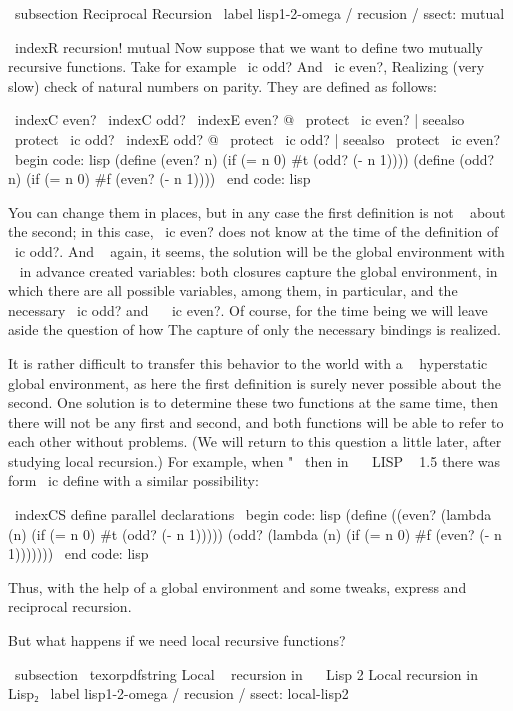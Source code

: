 \ subsection {Reciprocal Recursion} \ label {lisp1-2-omega / recusion / ssect: mutual}

\ indexR {recursion! mutual}
Now suppose that we want to define two mutually recursive functions.
Take for example \ ic {odd?} And \ ic {even?}, Realizing (very slow)
check of natural numbers on parity. They are defined as follows:

\ indexC {even?} \ indexC {odd?}
\ indexE {even? @ \ protect \ ic {even?} | seealso { \ protect \ ic {odd?}}}
\ indexE {odd? @ \ protect \ ic {odd?} | seealso { \ protect \ ic {even?}}}
\ begin {code: lisp}
(define (even? n)
  (if (= n 0) #t (odd? (- n 1))))
(define (odd? n)
  (if (= n 0) #f (even? (- n 1))))
\ end {code: lisp}

You can change them in places, but in any case the first definition is not ~
about the second; in this case, \ ic {even?} does not know at the time of the definition of
\ ic {odd?}. And ~ again, it seems, the solution will be the global environment with ~ in advance
created variables: both closures capture the global environment,
in which there are all possible variables, among them, in particular, and the necessary
\ ic {odd?} and ~ \ ic {even?}. Of course, for the time being we will leave aside the question of how
The capture of only the necessary bindings is realized.

It is rather difficult to transfer this behavior to the world with a ~ hyperstatic global
environment, as here the first definition is surely never possible
about the second. One solution is to determine these two functions
at the same time, then there will not be any first and second, and both functions will be able to
refer to each other without problems. (We will return to this question a little later,
after studying local recursion.) For example, when "~ then in ~ \ LISP ~ 1.5 there was
form \ ic {define} with a similar possibility:

\ indexCS {define} {parallel declarations}
\ begin {code: lisp}
(define ((even? (lambda (n) (if (= n 0) #t (odd? (- n 1)))))
         (odd? (lambda (n) (if (= n 0) #f (even? (- n 1)))))))
\ end {code: lisp}

Thus, with the help of a global environment and some tweaks,
express and reciprocal recursion.

But what happens if we need local recursive functions?


\ subsection { \ texorpdfstring {Local ~ recursion in ~ \ Lisp 2} %
{Local recursion in Lisp₂}} %
\ label {lisp1-2-omega / recusion / ssect: local-lisp2}

